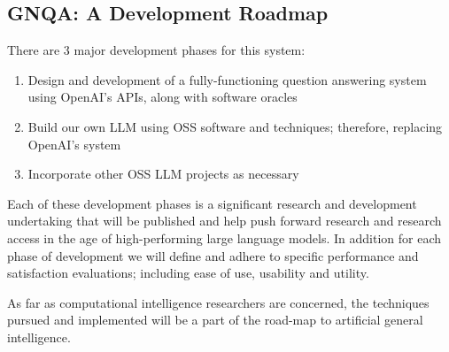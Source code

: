 \subsection{GNQA: A Development Roadmap}
There are 3 major development phases for this system:
\begin{enumerate}
    \item Design and development of a fully-functioning question answering system using OpenAI's APIs, along with software oracles
    \item Build our own LLM using OSS software and techniques; therefore, replacing OpenAI's system
    \item Incorporate other OSS LLM projects as necessary
\end{enumerate}

Each of these development phases is a significant research and development undertaking that will be published and help push forward research and research access in the age of high-performing large language models.
In addition for each phase of development we will define and adhere to specific performance and satisfaction evaluations; including ease of use, usability and utility.


As far as computational intelligence researchers are concerned, the techniques pursued and implemented will be a part of the road-map to artificial general intelligence.


